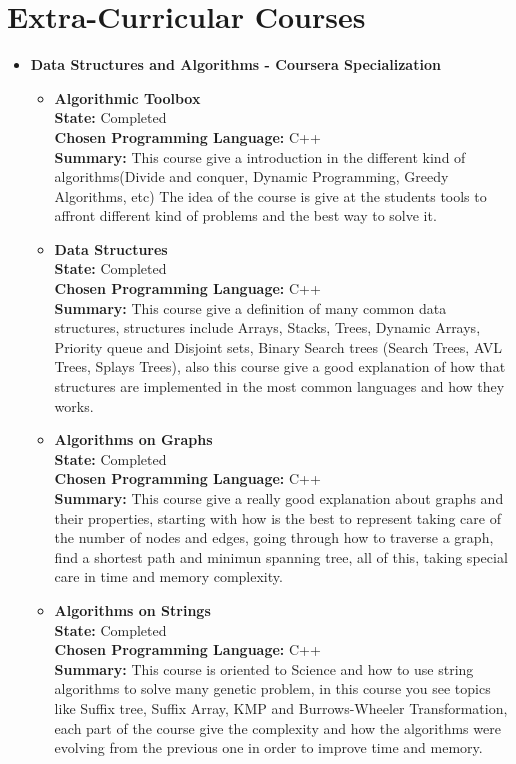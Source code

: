 \documentclass[a4paper,10pt]{article} %
\begin{document}
\section{Extra-Curricular Courses}
\begin{itemize}
\item \textbf{Data Structures and Algorithms - Coursera Specialization}\\
\begin{itemize}
\item \textbf{Algorithmic Toolbox}\\
\textbf{State:} Completed\\
\textbf{Chosen Programming Language:} C++\\
\textbf{Summary:} This course give a introduction in the different kind of algorithms(Divide and conquer, Dynamic Programming, Greedy Algorithms, etc) The idea of the course is give at the students tools to affront different kind of problems and the best way to solve it.\\
\item \textbf{Data Structures}\\
\textbf{State:} Completed\\
\textbf{Chosen Programming Language:} C++\\
\textbf{Summary:} This course give a definition of many common data structures, structures include Arrays, Stacks, Trees, Dynamic Arrays, Priority queue and Disjoint sets, Binary Search trees (Search Trees, AVL Trees, Splays Trees), also this course give a good explanation of how that structures are implemented in the most common languages and how they works.\\
\item \textbf{Algorithms on Graphs}\\
\textbf{State:} Completed\\
\textbf{Chosen Programming Language:} C++\\
\textbf{Summary:} This course give a really good explanation about graphs and their properties, starting with how is the best to represent taking care of the number of nodes and edges, going through how to traverse a graph, find a shortest path and minimun spanning tree, all of this, taking special care in time and memory complexity.
\item \textbf{Algorithms on Strings}\\
\textbf{State:} Completed\\
\textbf{Chosen Programming Language:} C++\\
\textbf{Summary:} This course is oriented to Science and how to use string algorithms to solve many genetic problem, in this course you see topics like Suffix tree, Suffix Array, KMP and Burrows-Wheeler Transformation,  each part of the course give the complexity and how the algorithms were evolving from the previous one in order to improve time and memory.

\end{itemize}
\end{itemize}
\end{document}
